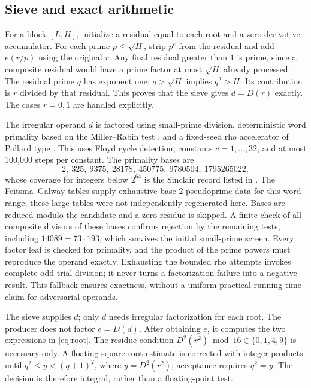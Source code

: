 \documentclass[11pt]{article}
\theoremstyle{definition}
\theoremstyle{remark}
\begin{document}
\subsection{Sieve and exact arithmetic}
For a block $[L,H]$, initialize a residual equal to each root and a zero
derivative accumulator. For each prime $p\leq\sqrt H$, strip $p^{e}$
from the residual and add $e(r/p)$ using the original $r$. Any final
residual greater than $1$ is prime, since a composite residual would
have a prime factor at most $\sqrt H$ already processed. The residual
prime $q$ has exponent one: $q>\sqrt H$ implies $q^{2}>H$. Its contribution
is $r$ divided by that residual. This proves that the sieve gives
$d=D(r)$ exactly. The cases $r=0,1$ are handled explicitly.

The irregular operand $d$ is factored using small-prime division,
deterministic word primality based on the Miller--Rabin test
\cite{miller,rabin}, and a fixed-seed rho accelerator of
Pollard type \cite{pollard}. This uses Floyd cycle detection,
constants $c=1,\ldots,32$, and at most 100,000 steps per constant.
The primality bases are
\[
 2,\ 325,\ 9375,\ 28178,\ 450775,\ 9780504,\ 1795265022,
\]
whose coverage for integers below $2^{64}$ is the Sinclair record
listed in \cite{mr}. The Feitsma--Galway tables \cite{feitsma} supply
exhaustive base-2 pseudoprime data for this word range; these large
tables were not independently regenerated here. Bases are reduced
modulo the candidate and a zero residue is skipped. A finite check
of all composite divisors of these bases confirms rejection by the
remaining tests, including $14089=73\cdot193$, which survives the
initial small-prime screen. Every factor leaf is checked for primality, and
the product of the prime powers must reproduce the operand exactly.
Exhausting the bounded rho attempts invokes complete odd trial division;
it never turns a factorization failure into a negative result. This
fallback ensures exactness, without a uniform practical running-time
claim for adversarial operands.

The sieve supplies $d$; only $d$ needs irregular factorization for
each root. The producer does not factor $e=D(d)$. After obtaining $e$,
it computes the two expressions
in \eqref{eq:root}. The residue condition
$D^{2}(r^{2})\bmod16\in\{0,1,4,9\}$ is necessary only. A floating
square-root estimate is corrected with integer products until
$q^{2}\leq y<(q+1)^{2}$, where $y=D^{2}(r^{2})$; acceptance requires
$q^{2}=y$. The decision is therefore integral, rather than a
floating-point test.
\end{document}
